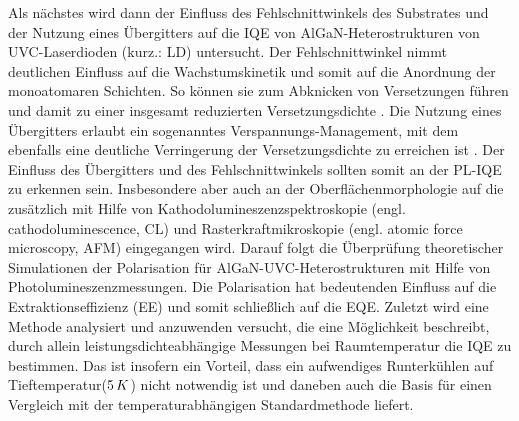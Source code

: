 Als nächstes wird dann der Einfluss des Fehlschnittwinkels des Substrates und der Nutzung eines Übergitters auf die IQE von AlGaN-Heterostrukturen von UVC-Laserdioden (kurz.: LD) untersucht. Der Fehlschnittwinkel nimmt deutlichen Einfluss auf die Wachstumskinetik und somit auf die Anordnung der monoatomaren Schichten. So können sie zum Abknicken von Versetzungen führen und damit zu einer insgesamt reduzierten Versetzungsdichte \cite{jeschke}. Die Nutzung eines Übergitters erlaubt ein sogenanntes Verspannungs-Management, mit dem ebenfalls eine deutliche Verringerung der Versetzungsdichte zu erreichen ist \cite{doi:10.1063/1.2136424}. Der Einfluss des Übergitters und des Fehlschnittwinkels sollten somit an der PL-IQE zu erkennen sein. Insbesondere aber auch an der Oberflächenmorphologie auf die zusätzlich mit Hilfe von Kathodolumineszenzspektroskopie (engl. cathodoluminescence, CL) und Rasterkraftmikroskopie (engl. atomic force microscopy, AFM) eingegangen wird.
\newline
Darauf folgt die Überprüfung theoretischer Simulationen der Polarisation für AlGaN-UVC-Heterostrukturen mit Hilfe von Photolumineszenzmessungen. Die Polarisation hat bedeutenden Einfluss auf die Extraktionseffizienz (EE) und somit schließlich auf die EQE.
\newline
Zuletzt wird eine Methode analysiert und anzuwenden versucht, die eine Möglichkeit beschreibt, durch allein leistungsdichteabhängige Messungen bei Raumtemperatur die IQE zu bestimmen. Das ist insofern ein Vorteil, dass ein aufwendiges Runterkühlen auf Tieftemperatur($5 \thinspace K$) nicht notwendig ist und daneben auch die Basis für einen Vergleich mit der temperaturabhängigen Standardmethode liefert.














